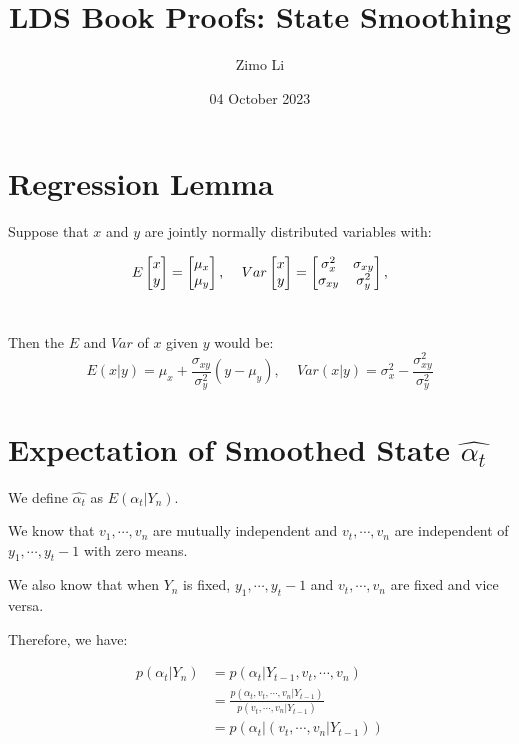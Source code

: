 \documentclass{article}
\title{LDS Book Proofs: State Smoothing}
\author{Zimo Li}
\date{04 October 2023}
\begin{document}
\maketitle

\section{Regression Lemma}

Suppose that \(x\) and \(y\) are jointly normally distributed variables with:

\[
E
\begin{bmatrix}
x\\
y
\end{bmatrix}
=
\begin{bmatrix}
\mu_{x}\\
\mu_{y}
\end{bmatrix} \text{, }\quad
\centering
Var
\begin{bmatrix}
x\\
y
\end{bmatrix}
=
\begin{bmatrix}
\sigma_{x}^2 & \sigma_{xy}\\
\sigma_{xy} & \sigma_{y}^2
\end{bmatrix},
\]\\

\par\noindent
Then the \(E\) and \(Var\) of \(x\) given \(y\) would be:
\[
E(x|y) = \mu_x + \frac{\sigma_{xy}}{\sigma_{y}^2}(y-\mu_{y})\text{, }\quad
Var(x|y) = \sigma_{x}^2 - \frac{\sigma_{xy}^2}{\sigma_{y}^2}
\]

\section{Expectation of Smoothed State \(\hat{\alpha_t}\)}

We define  \(\hat{\alpha_t}\) as \(E(\alpha_{t}|Y_{n})\). \\
\par\noindent
We know that \(v_1, \cdots, v_n\) are mutually independent and \(v_t, \cdots, v_n\) are independent of \(y_1, \cdots, y_t-1\) with zero means.\\
\par\noindent
We also know that when \(Y_n\) is fixed, \(y_1, \cdots, y_t-1\) and \(v_t, \cdots, v_n\) are fixed and vice versa.\\
\par\noindent
Therefore, we have:

\begin{align}
    p(\alpha_{t}|Y_{n}) &=  p(\alpha_{t}|Y_{t-1}, v_t, \cdots, v_n)\\
    &= \frac{p(\alpha_{t}, v_t, \cdots, v_n|Y_{t-1})}{p(v_t, \cdots, v_n|Y_{t-1})}\\
    &= p(\alpha_{t}| (v_t, \cdots, v_n | Y_{t-1}))
\end{align}
\end{document}
